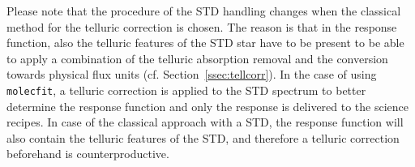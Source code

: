 
Please note that the procedure of the \ac{STD} handling changes when the classical method for the telluric correction is chosen. The reason is that in the response function, also the telluric features of the \ac{STD} star have to be present to be able to apply a combination of the telluric absorption removal and the conversion towards physical flux units (cf. Section~\ref{ssec:tellcorr}). In the case of using \texttt{molecfit}, a telluric correction is applied to the \ac{STD} spectrum to better determine the response function and only the response is delivered to the science recipes. In case of the classical approach with a \ac{STD}, the response function will also contain the telluric features of the \ac{STD}, and therefore a telluric correction beforehand is counterproductive.\\

